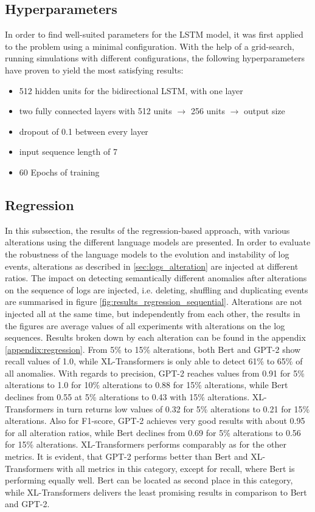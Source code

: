 \subsection{Hyperparameters}
In order to find well-suited parameters for the LSTM model, it was first applied to the problem using a minimal configuration. With the help of a grid-search, running simulations with different configurations, the following hyperparameters have proven to yield the most satisfying results:
\begin{itemize}
	\item 512 hidden units for the bidirectional LSTM, with one layer
	\item two fully connected layers with 512 units $\rightarrow$ 256 units $\rightarrow$ output size
	\item dropout of 0.1 between every layer
	\item input sequence length of 7
	\item 60 Epochs of training
\end{itemize}

\subsection{Regression\label{sec:results-regression}}
In this subsection, the results of the regression-based approach, with various alterations using the different language models are presented. In order to evaluate the robustness of the language models to the evolution and instability of log events, alterations as described in \ref{sec:logs_alteration} are injected at different ratios. The impact on detecting semantically different anomalies after alterations on the sequence of logs are injected, i.e. deleting, shuffling and duplicating events are summarised in figure \ref{fig:results_regression_sequential}. Alterations are not injected all at the same time, but independently from each other, the results in the figures are average values of all experiments with alterations on the log sequences. Results broken down by each alteration can be found in the appendix \ref{appendix:regression}. From 5\% to 15\% alterations, both Bert and GPT-2 show recall values of 1.0, while XL-Transformers is only able to detect 61\% to 65\% of all anomalies. With regards to precision, GPT-2 reaches values from 0.91 for 5\% alterations to 1.0 for 10\% alterations to 0.88 for 15\% alterations, while Bert declines from 0.55 at 5\% alterations to 0.43 with 15\% alterations. XL-Transformers in turn returns low values of 0.32 for 5\% alterations to 0.21 for 15\% alterations. Also for F1-score, GPT-2 achieves very good results with about 0.95 for all alteration ratios, while Bert declines from 0.69 for 5\% alterations to 0.56 for 15\% alterations. XL-Transformers performs comparably as for the other metrics. It is evident, that GPT-2 performs better than Bert and XL-Transformers with all metrics in this category, except for recall, where Bert is performing equally well. Bert can be located as second place in this category, while XL-Transformers delivers the least promising results in comparison to Bert and GPT-2.

